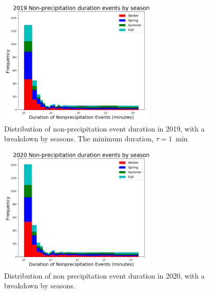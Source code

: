\documentclass[11pt]{report}
\begin{document}
\clearpage
\begin{figure}[t]
	\centering
	\includegraphics[width=0.675\textwidth]{Figures/nonprecip_2019.png}
	\caption[Histogram of non-precipitation events for 2019 broken
	down by season]{\label{np2019} Distribution of
		non-precipitation event duration in 2019, with a breakdown
		by seasons. The minimum duration, $\tau=1$~min %
	}
\end{figure}

\begin{figure}[b]
	\centering
	\includegraphics[width=0.675\textwidth]{Figures/nonprecip_2020.png}
	\caption[Histogram of non-precipitation events for 2020 broken down by
	season]{\label{np2020} Distribution of non precipitation event duration
		in 2020, with a breakdown by seasons. }
\end{figure}
\end{document}
